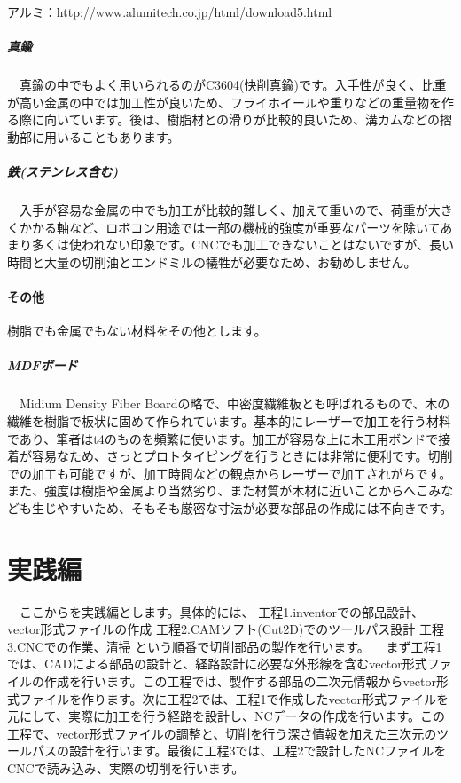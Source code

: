\documentclass[b5paper, 9pt, twocolumn, titlepage]{jsbook}%
\begin{document}
アルミ：http://www.alumitech.co.jp/html/download5.html

\subsubsection{真鍮}

　真鍮の中でもよく用いられるのがC3604(快削真鍮)です。入手性が良く、比重が高い金属の中では加工性が良いため、フライホイールや重りなどの重量物を作る際に向いています。後は、樹脂材との滑りが比較的良いため、溝カムなどの摺動部に用いることもあります。
　
\subsubsection{鉄(ステンレス含む)}

　入手が容易な金属の中でも加工が比較的難しく、加えて重いので、荷重が大きくかかる軸など、ロボコン用途では一部の機械的強度が重要なパーツを除いてあまり多くは使われない印象です。CNCでも加工できないことはないですが、長い時間と大量の切削油とエンドミルの犠牲が必要なため、お勧めしません。

\subsection{その他}

 樹脂でも金属でもない材料をその他とします。

\subsubsection{MDFボード}

　Midium Density Fiber Boardの略で、中密度繊維板とも呼ばれるもので、木の繊維を樹脂で板状に固めて作られています。基本的にレーザーで加工を行う材料であり、筆者はt4のものを頻繁に使います。加工が容易な上に木工用ボンドで接着が容易なため、さっとプロトタイピングを行うときには非常に便利です。切削での加工も可能ですが、加工時間などの観点からレーザーで加工されがちです。また、強度は樹脂や金属より当然劣り、また材質が木材に近いことからへこみなども生じやすいため、そもそも厳密な寸法が必要な部品の作成には不向きです。

\part{実践編}

　ここからを実践編とします。具体的には、
工程1.inventorでの部品設計、vector形式ファイルの作成
工程2.CAMソフト(Cut2D)でのツールパス設計
工程3.CNCでの作業、清掃
という順番で切削部品の製作を行います。
　まず工程1では、CADによる部品の設計と、経路設計に必要な外形線を含むvector形式ファイルの作成を行います。この工程では、製作する部品の二次元情報からvector形式ファイルを作ります。次に工程2では、工程1で作成したvector形式ファイルを元にして、実際に加工を行う経路を設計し、NCデータの作成を行います。この工程で、vector形式ファイルの調整と、切削を行う深さ情報を加えた三次元のツールパスの設計を行います。最後に工程3では、工程2で設計したNCファイルをCNCで読み込み、実際の切削を行います。
\end{document}
